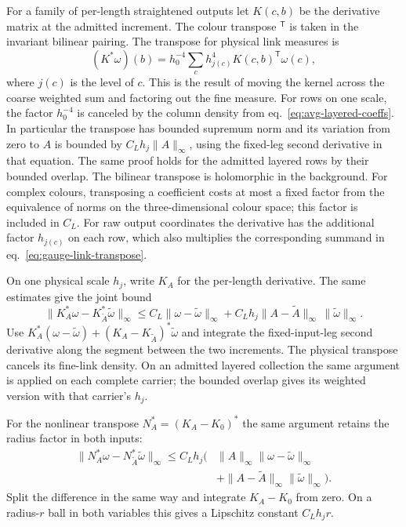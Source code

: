 \documentclass[11pt,letterpaper,reqno]{amsart}
\numberwithin{equation}{section}
\renewcommand{\eqref}[1]{\textup{eq.~\ref{#1}}}
\theoremstyle{definition}
\theoremstyle{remark}
\begin{document}
For a family of per-length straightened outputs let \(K(c,b)\)
be the derivative matrix at the admitted increment. The colour
transpose \({}^{\mathsf T}\) is taken in the invariant bilinear
pairing. The transpose for physical link measures is
\begin{equation}\label{eq:gauge-link-transpose}
 (K^\ast\omega)(b)=h_0^{-4}\sum_c h_{j(c)}^4
                         K(c,b)^{\mathsf T}\omega(c),
\end{equation}
where \(j(c)\) is the level of \(c\). This is the result of moving
the kernel across the coarse weighted sum and factoring out the
fine measure. For rows on one scale, the factor \(h_0^{-4}\)
is canceled by the column density from
\eqref{eq:avg-layered-coeffs}. In particular the transpose has
bounded supremum norm and its variation from zero to \(A\) is
bounded by \(C_L h_j\|A\|_\infty\), using the fixed-leg
second derivative in that equation. The same proof holds for the
admitted layered rows by their bounded overlap. The bilinear
transpose is holomorphic in the background. For complex colours,
transposing a coefficient costs at most a fixed factor from the
equivalence of norms on the three-dimensional colour space; this
factor is included in $C_L$. For raw output
coordinates the derivative has the additional factor \(h_{j(c)}\)
on each row, which also multiplies the corresponding summand in
\eqref{eq:gauge-link-transpose}.

On one physical scale $h_j$, write $K_A$ for the per-length
derivative. The same estimates give the joint bound
\begin{equation}\label{eq:gauge-joint-transpose}
 \|K_A^*\omega-K_{\widetilde A}^*\widetilde\omega\|_\infty
 \le C_L\|\omega-\widetilde\omega\|_\infty
   +C_Lh_j\|A-\widetilde A\|_\infty\,
                              \|\widetilde\omega\|_\infty .
\end{equation}
Use $K_A^*(\omega-\widetilde\omega)+
(K_A-K_{\widetilde A})^*\widetilde\omega$ and integrate the
fixed-input-leg second derivative along the segment between the
two increments. The physical transpose cancels its fine-link
density. On an admitted layered collection the same argument is
applied on each complete carrier; the bounded overlap gives its
weighted version with that carrier's $h_j$.

For the nonlinear transpose $N_A^*=(K_A-K_0)^*$ the same argument
retains the radius factor in both inputs:
\begin{equation}\label{eq:gauge-nonlinear-transpose}
 \begin{split}
 \|N_A^*\omega-N_{\widetilde A}^*\widetilde\omega\|_\infty
 \le C_Lh_j\bigl(&\|A\|_\infty\|\omega-\widetilde\omega\|_\infty\\
             &+\|A-\widetilde A\|_\infty\|\widetilde\omega\|_\infty\bigr).
 \end{split}
\end{equation}
Split the difference in the same way and integrate $K_A-K_0$
from zero. On a radius-$r$ ball in both variables this gives
a Lipschitz constant $C_Lh_jr$.
\end{document}
